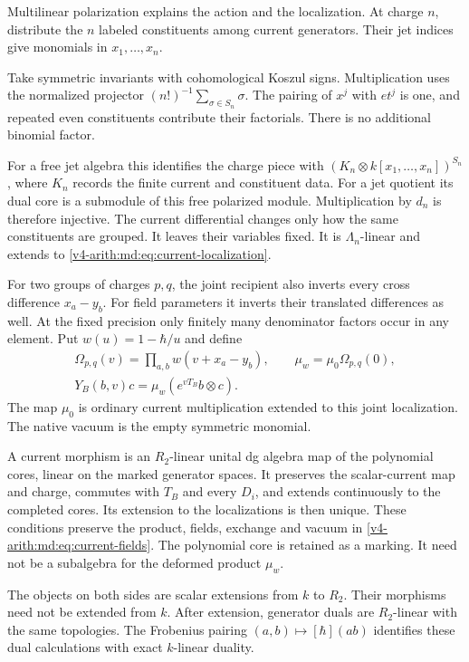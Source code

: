 Multilinear polarization explains the action and the
localization. At charge $n$, distribute the $n$ labeled
constituents among current generators. Their jet indices
give monomials in $x_1,\ldots,x_n$.

Take symmetric
invariants with cohomological Koszul signs.
Multiplication uses the normalized projector
$(n!)^{-1}\sum_{\sigma\in S_n}\sigma$. The pairing
of $x^j$ with $et^j$ is one, and repeated even
constituents contribute their factorials. There is no
additional binomial factor.

For a free jet algebra this identifies the charge piece
with $(K_n\otimes k[x_1,\ldots,x_n])^{S_n}$, where $K_n$
records the finite current and constituent data.
For a jet quotient its dual core is a submodule of this
free polarized module. Multiplication by $d_n$ is
therefore injective. The current differential changes
only how the same constituents are grouped. It leaves
their variables fixed. It is $\Lambda_n$-linear and
extends to \eqref{v4-arith:md:eq:current-localization}.

For two groups of charges $p,q$, the joint recipient
also inverts every cross difference $x_a-y_b$.
For field parameters it inverts their translated
differences as well. At the fixed precision only
finitely many denominator factors occur in any element.
Put $w(u)=1-\hbar/u$ and define
\begin{equation}\label{v4-arith:md:eq:current-fields}
 \begin{gathered}
 \Omega_{p,q}(v)=\prod_{a,b}w(v+x_a-y_b),
 \qquad \mu_w=\mu_0\Omega_{p,q}(0),\\
 Y_B(b,v)c=\mu_w(e^{vT_B}b\otimes c).
 \end{gathered}
\end{equation}
The map $\mu_0$ is ordinary current multiplication
extended to this joint localization. The native vacuum
is the empty symmetric monomial.

A current morphism is an $R_2$-linear unital dg algebra
map of the polynomial cores, linear on the marked
generator spaces. It preserves the scalar-current map
and charge, commutes with $T_B$ and every $D_i$, and
extends continuously to the completed cores.
Its extension to the localizations is then unique.
These conditions preserve the product, fields, exchange
and vacuum in \eqref{v4-arith:md:eq:current-fields}.
The polynomial core is retained as a marking. It need
not be a subalgebra for the deformed product $\mu_w$.

The objects on both sides are scalar extensions from
$k$ to $R_2$. Their morphisms need not be extended from
$k$. After extension, generator duals are $R_2$-linear
with the same topologies. The Frobenius pairing
$(a,b)\mapsto[\hbar](ab)$ identifies these dual calculations
with exact $k$-linear duality.

